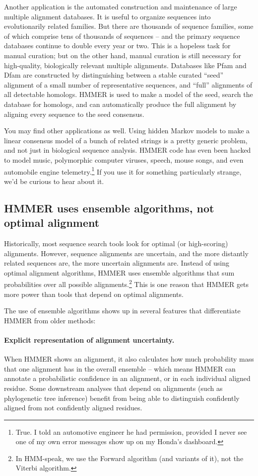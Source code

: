 Another application is the automated construction and maintenance of
large multiple alignment databases.  It is useful to organize
sequences into evolutionarily related families. But there are
thousands of sequence families, some of which comprise tens of
thousands of sequences -- and the primary sequence databases continue
to double every year or two. This is a hopeless task for manual
curation; but on the other hand, manual curation is still necessary
for high-quality, biologically relevant multiple alignments. Databases
like Pfam \citep{FinnBateman16} and Dfam \citep{Wheeler13} are
constructed by distinguishing between a stable curated ``seed''
alignment of a small number of representative sequences, and ``full''
alignments of all detectable homologs. HMMER is used to make a model
of the seed, search the database for homologs, and can automatically
produce the full alignment by aligning every sequence to the seed
consensus.

You may find other applications as well. Using hidden Markov models to
make a linear consensus model of a bunch of related strings is a
pretty generic problem, and not just in biological sequence analysis.
HMMER code has even been hacked to model music, polymorphic computer
viruses, speech, mouse songs, and even automobile engine
telemetry.\footnote{True. I told an automotive engineer he had
  permission, provided I never see one of my own error messages
  show up on my Honda's dashboard.}  If you use it for something
particularly strange, we'd be curious to hear about it.


\subsection{HMMER uses ensemble algorithms, not optimal alignment}

Historically, most sequence search tools look for optimal (or
high-scoring) alignments. However, sequence alignments are uncertain,
and the more distantly related sequences are, the more uncertain
alignments are. Instead of using optimal alignment algorithms, HMMER
uses ensemble algorithms that sum probabilities over all possible
alignments.\footnote{In HMM-speak, we use the Forward algorithm (and
  variants of it), not the Viterbi algorithm.} This is one reason that
HMMER gets more power than tools that depend on optimal alignments.

The use of ensemble algorithms shows up in several features that
differentiate HMMER from older methods:

\paragraph{Explicit representation of alignment uncertainty.}
  When HMMER shows an alignment, it also calculates how much
  probability mass that one alignment has in the overall ensemble --
  which means HMMER can annotate a probabilistic confidence in an
  alignment, or in each individual aligned residue. Some downstream
  analyses that depend on alignments (such as phylogenetic tree
  inference) benefit from being able to distinguish confidently
  aligned from not confidently aligned residues.

